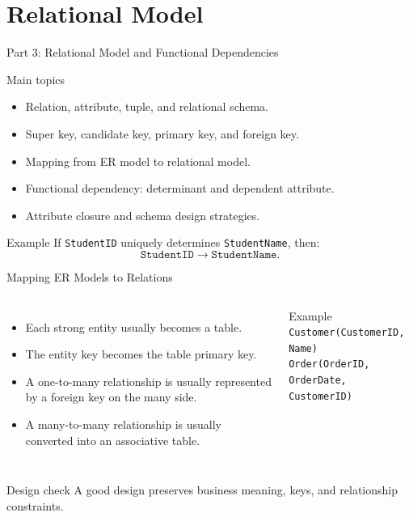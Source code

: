 \documentclass[aspectratio=169,11pt]{beamer}
\begin{document}
\section{Relational Model}
\begin{frame}{Part 3: Relational Model and Functional Dependencies}
\begin{block}{Main topics}
\begin{itemize}
  \item Relation, attribute, tuple, and relational schema.
  \item Super key, candidate key, primary key, and foreign key.
  \item Mapping from ER model to relational model.
  \item Functional dependency: determinant and dependent attribute.
  \item Attribute closure and schema design strategies.
\end{itemize}
\end{block}

\begin{exampleblock}{Example}
If \texttt{StudentID} uniquely determines \texttt{StudentName}, then:
\[
\texttt{StudentID} \rightarrow \texttt{StudentName}.
\]
\end{exampleblock}
\end{frame}

\begin{frame}{Mapping ER Models to Relations}
\begin{columns}[T,onlytextwidth]
\begin{itemize}
  \item Each strong entity usually becomes a table.
  \item The entity key becomes the table primary key.
  \item A one-to-many relationship is usually represented by a foreign key on the many side.
  \item A many-to-many relationship is usually converted into an associative table.
\end{itemize}
\begin{block}{Example}
\texttt{Customer(CustomerID, Name)}\\
\texttt{Order(OrderID, OrderDate, CustomerID)}
\end{block}
\end{columns}

\begin{alertblock}{Design check}
A good design preserves business meaning, keys, and relationship constraints.
\end{alertblock}
\end{frame}
\end{document}
